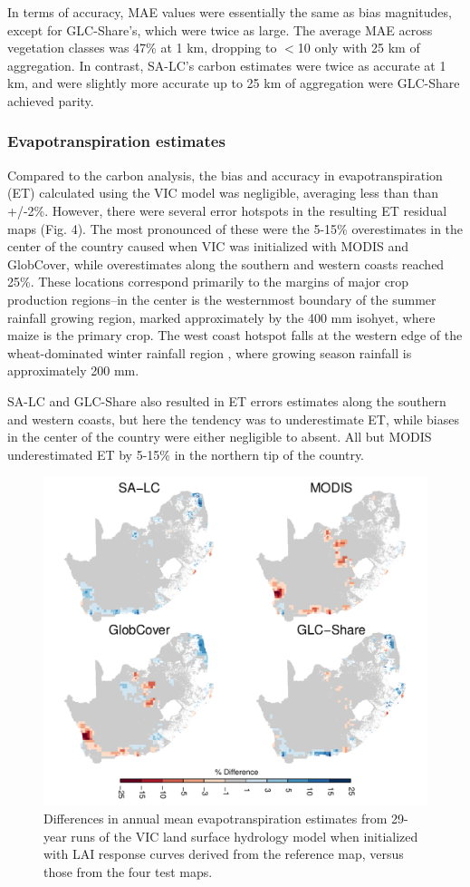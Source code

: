 \documentclass[12 pt, titlepage, a4paper]{article}
\begin{document}
In terms of accuracy, MAE values were essentially the same as bias magnitudes, except for GLC-Share's, which were twice as large. The average MAE across vegetation classes was 47\% at 1 km, dropping to $<$10 only with 25 km of aggregation. In contrast, SA-LC's carbon estimates were twice as accurate at 1 km, and were slightly more accurate up to 25 km of aggregation were GLC-Share achieved parity.  

\vspace{-0.3 cm}
\subsubsection*{Evapotranspiration estimates}
\vspace{-0.2 cm}
Compared to the carbon analysis, the bias and accuracy in evapotranspiration (ET) calculated using the VIC model was negligible, averaging less than than +/-2\%. However, there were several error hotspots in the resulting ET residual maps (Fig. 4). The most pronounced of these were the 5-15\% overestimates in the center of the country caused when VIC was initialized with MODIS and GlobCover, while overestimates along the southern and western coasts reached 25\%. These locations correspond primarily to the margins of major crop production regions--in the center is the westernmost boundary of the summer rainfall growing region, marked approximately by the 400 mm isohyet, where maize is the primary crop. The west coast hotspot falls at the western edge of the wheat-dominated winter rainfall region \citep{hardy_rainfed_2011}, where growing season rainfall is approximately 200 mm. 

SA-LC and GLC-Share also resulted in ET errors estimates along the southern and western coasts, but here the tendency was to underestimate ET, while biases in the center of the country were either negligible to absent.  All but MODIS underestimated ET by 5-15\% in the northern tip of the country.  
%
\begin{figure}[h]
\centerline{\includegraphics[width=.6\textwidth]{figures/fig4.pdf}}
\caption{Differences in annual mean evapotranspiration estimates from 29-year runs of the VIC land surface hydrology model when initialized with LAI response curves derived from the reference map, versus those from the four test maps.}\label{afoto}
\end{figure}
\end{document}
